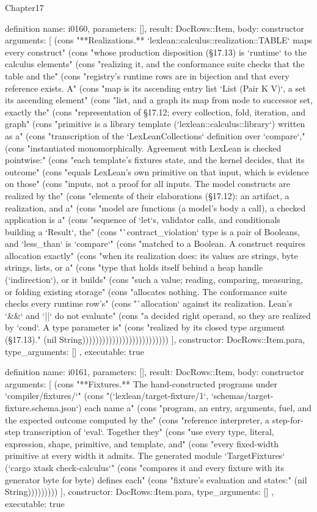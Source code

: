 \begin{lexlean}{Chapter17}
\begin{semanticmodule}
definition{
  name: i0160,
  parameters: [],
  result: DocRows::Item,
  body: constructor{
    arguments: [
      (cons "**Realizations.** `lexlean::calculus::realization::TABLE` maps every construct" (cons "whose production disposition (§17.13) is `runtime` to the calculus elements" (cons "realizing it, and the conformance suite checks that the table and the" (cons "registry's runtime rows are in bijection and that every reference exists. A" (cons "map is its ascending entry list `List (Pair K V)`, a set its ascending element" (cons "list, and a graph its map from node to successor set, exactly the" (cons "representation of §17.12; every collection, fold, iteration, and graph" (cons "primitive is a library template (`lexlean::calculus::library`) written as a" (cons "transcription of the `LexLeanCollections` definition over `compare`," (cons "instantiated monomorphically. Agreement with LexLean is checked pointwise:" (cons "each template's fixtures state, and the kernel decides, that its outcome" (cons "equals LexLean's own primitive on that input, which is evidence on those" (cons "inputs, not a proof for all inputs. The model constructs are realized by the" (cons "elements of their elaborations (§17.12): an artifact, a realization, and a" (cons "model are functions (a model's body a call), a checked application is a" (cons "sequence of `let`s, validator calls, and conditionals building a `Result`, the" (cons "`contract_violation` type is a pair of Booleans, and `less_than` is `compare`" (cons "matched to a Boolean. A construct requires allocation exactly" (cons "when its realization does: its values are strings, byte strings, lists, or a" (cons "type that holds itself behind a heap handle (`indirection`), or it builds" (cons "such a value; reading, comparing, measuring, or folding existing storage" (cons "allocates nothing. The conformance suite checks every runtime row's" (cons "`allocation` against its realization. Lean's `&&` and `||` do not evaluate" (cons "a decided right operand, so they are realized by `cond`. A type parameter is" (cons "realized by its closed type argument (§17.13)." (nil String))))))))))))))))))))))))))
    ],
    constructor: DocRows::Item.para,
    type_arguments: []
  },
  executable: true
}

definition{
  name: i0161,
  parameters: [],
  result: DocRows::Item,
  body: constructor{
    arguments: [
      (cons "**Fixtures.** The hand-constructed programs under `compiler/fixtures/`" (cons "(`lexlean/target-fixture/1`, `schemas/target-fixture.schema.json`) each name a" (cons "program, an entry, arguments, fuel, and the expected outcome computed by the" (cons "reference interpreter, a step-for-step transcription of `eval`. Together they" (cons "use every type, literal, expression, shape, primitive, and template, and" (cons "every fixed-width primitive at every width it admits. The generated module `TargetFixtures` (`cargo xtask check-calculus`" (cons "compares it and every fixture with its generator byte for byte) defines each" (cons "fixture's evaluation and states:" (nil String)))))))))
    ],
    constructor: DocRows::Item.para,
    type_arguments: []
  },
  executable: true
}


\end{semanticmodule}
\end{lexlean}

